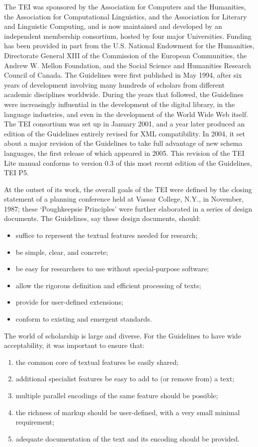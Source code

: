 \documentclass[11pt,twoside]{article}\makeatletter
\begin{document}
The TEI was sponsored by the Association for Computers and the Humanities, the Association for Computational Linguistics, and the Association for Literary and Linguistic Computing, and is now maintained and developed by an independent membership consortium, hosted by four major Universities. Funding has been provided in part from the U.S. National Endowment for the Humanities, Directorate General XIII of the Commission of the European Communities, the Andrew W. Mellon Foundation, and the Social Science and Humanities Research Council of Canada. The Guidelines were first published in May 1994, after six years of development involving many hundreds of scholars from different academic disciplines worldwide. During the years that followed, the Guidelines were increasingly influential in the development of the digital library, in the language industries, and even in the development of the World Wide Web itself. The TEI consortium was set up in January 2001, and a year later produced an edition of the Guidelines entirely revised for XML compatibility. In 2004, it set about a major revision of the Guidelines to take full advantage of new schema languages, the first release of which appeared in 2005. This revision of the TEI Lite manual conforms to version 0.3 of this most recent edition of the Guidelines, TEI P5.\par
At the outset of its work, the overall goals of the TEI were defined by the closing statement of a planning conference held at Vassar College, N.Y., in November, 1987; these ‘Poughkeepsie Principles’ were further elaborated in a series of design documents. The Guidelines, say these design documents, should: \begin{itemize}
\item suffice to represent the textual features needed for research;
\item be simple, clear, and concrete;
\item be easy for researchers to use without special-purpose software;
\item allow the rigorous definition and efficient processing of texts;
\item provide for user-defined extensions;
\item conform to existing and emergent standards.
\end{itemize} \par
The world of scholarship is large and diverse. For the Guidelines to have wide acceptability, it was important to ensure that: \begin{enumerate}
\item the common core of textual features be easily shared;
\item additional specialist features be easy to add to (or remove from) a text;
\item multiple parallel encodings of the same feature should be possible;
\item the richness of markup should be user-defined, with a very small minimal requirement;
\item adequate documentation of the text and its encoding should be provided.
\end{enumerate}\par
\end{document}
